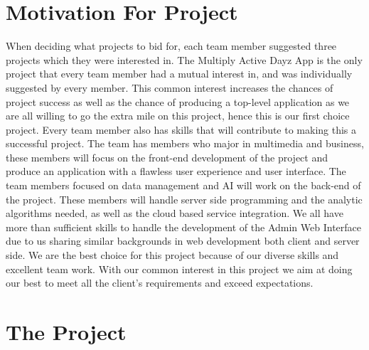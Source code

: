 \documentclass[11pt]{article}
\begin{document}
\section{Motivation For Project}
When deciding what projects to bid for, each team member suggested three projects which they were interested in. The Multiply Active Dayz App is the only project that every team member had a mutual interest in, and was individually suggested by every member. This common interest increases the chances of project success as well as the chance of producing a top-level application as we are all willing to go the extra mile on this project, hence this is our first choice project.
\newline
\newline Every team member also has skills that will contribute to making this a successful project. The team has members who major in multimedia and business, these members will focus on the front-end development of the project and produce an application with a flawless user experience and user interface. The team members focused on data management and AI will work on the back-end of the project. These members will handle server side programming and the analytic algorithms needed, as well as the cloud based service integration. We all have more than sufficient skills to handle the development of the Admin Web Interface due to us sharing similar backgrounds in web development both client and server side. 
\newline
\newline We are the best choice for this project because of our diverse skills and excellent team work. With our common interest in this project we aim at doing our best to meet all the client's requirements and exceed expectations.

\section{The Project}
\end{document}
